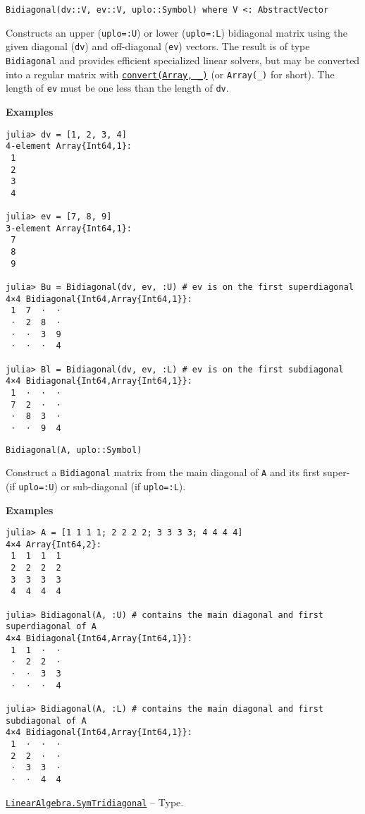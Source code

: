 \begin{adjustwidth}{2em}{0pt}


\begin{verbatim}
Bidiagonal(dv::V, ev::V, uplo::Symbol) where V <: AbstractVector
\end{verbatim}

Constructs an upper (\texttt{uplo=:U}) or lower (\texttt{uplo=:L}) bidiagonal matrix using the given diagonal (\texttt{dv}) and off-diagonal (\texttt{ev}) vectors. The result is of type \texttt{Bidiagonal} and provides efficient specialized linear solvers, but may be converted into a regular matrix with \hyperlink{1846942650946171605}{\texttt{convert(Array, \_)}} (or \texttt{Array(\_)} for short). The length of \texttt{ev} must be one less than the length of \texttt{dv}.

\textbf{Examples}


\begin{verbatim}
julia> dv = [1, 2, 3, 4]
4-element Array{Int64,1}:
 1
 2
 3
 4

julia> ev = [7, 8, 9]
3-element Array{Int64,1}:
 7
 8
 9

julia> Bu = Bidiagonal(dv, ev, :U) # ev is on the first superdiagonal
4×4 Bidiagonal{Int64,Array{Int64,1}}:
 1  7  ⋅  ⋅
 ⋅  2  8  ⋅
 ⋅  ⋅  3  9
 ⋅  ⋅  ⋅  4

julia> Bl = Bidiagonal(dv, ev, :L) # ev is on the first subdiagonal
4×4 Bidiagonal{Int64,Array{Int64,1}}:
 1  ⋅  ⋅  ⋅
 7  2  ⋅  ⋅
 ⋅  8  3  ⋅
 ⋅  ⋅  9  4
\end{verbatim}




\begin{lstlisting}
Bidiagonal(A, uplo::Symbol)
\end{lstlisting}

Construct a \texttt{Bidiagonal} matrix from the main diagonal of \texttt{A} and its first super- (if \texttt{uplo=:U}) or sub-diagonal (if \texttt{uplo=:L}).

\textbf{Examples}


\begin{verbatim}
julia> A = [1 1 1 1; 2 2 2 2; 3 3 3 3; 4 4 4 4]
4×4 Array{Int64,2}:
 1  1  1  1
 2  2  2  2
 3  3  3  3
 4  4  4  4

julia> Bidiagonal(A, :U) # contains the main diagonal and first superdiagonal of A
4×4 Bidiagonal{Int64,Array{Int64,1}}:
 1  1  ⋅  ⋅
 ⋅  2  2  ⋅
 ⋅  ⋅  3  3
 ⋅  ⋅  ⋅  4

julia> Bidiagonal(A, :L) # contains the main diagonal and first subdiagonal of A
4×4 Bidiagonal{Int64,Array{Int64,1}}:
 1  ⋅  ⋅  ⋅
 2  2  ⋅  ⋅
 ⋅  3  3  ⋅
 ⋅  ⋅  4  4
\end{verbatim}



\end{adjustwidth}
\hypertarget{6062797780727203318}{} 
\hyperlink{6062797780727203318}{\texttt{LinearAlgebra.SymTridiagonal}}  -- {Type.}

